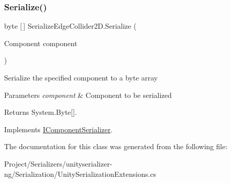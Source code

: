 \subsubsection{\texorpdfstring{Serialize()}{Serialize()}}
{\footnotesize\ttfamily byte \mbox{[}$\,$\mbox{]} Serialize\+Edge\+Collider2\+D.\+Serialize (\begin{DoxyParamCaption}\item[{Component}]{component }\end{DoxyParamCaption})\hspace{0.3cm}{\ttfamily [inline]}}



Serialize the specified component to a byte array 


\begin{DoxyParams}{Parameters}
{\em component} & Component to be serialized\\
\hline
\end{DoxyParams}
\begin{DoxyReturn}{Returns}
System.\+Byte\mbox{[}\mbox{]}.
\end{DoxyReturn}


Implements \hyperlink{interface_i_component_serializer_ab2aa38005665496b62d6c54b5f0dbd31}{I\+Component\+Serializer}.



The documentation for this class was generated from the following file\+:\begin{DoxyCompactItemize}
\item 
Project/\+Serializers/unityserializer-\/ng/\+Serialization/Unity\+Serialization\+Extensions.\+cs\end{DoxyCompactItemize}
